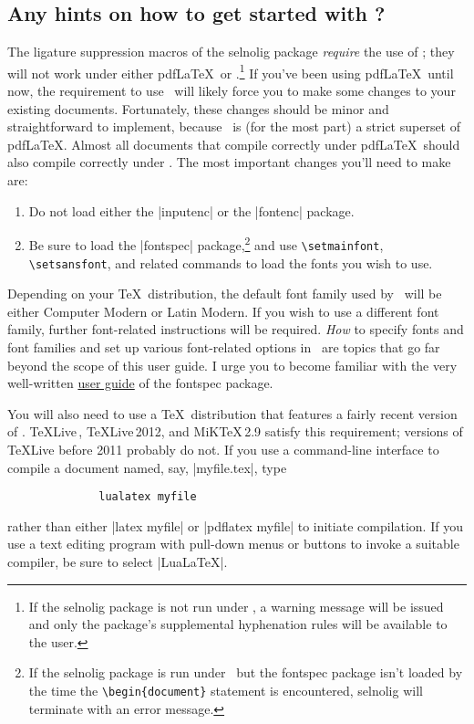 \documentclass[11pt]{article}
\newcommand{\pkg}[1]{\textsf{#1}}
\newcommand{\cmmd}[1]{\texttt{\textbackslash #1}}
\begin{document}
\subsection{Any hints on how to get started with \LuaLaTeX?}

\begingroup
\renewcommand\theenumi{(\roman{enumi})}
\renewcommand\labelenumi\theenumi

The ligature suppression macros of the \pkg{selnolig} package \emph{require} the use of \LuaLaTeX; they will not work under either pdf\LaTeX\ or \XeLaTeX.\footnote{If the \pkg{selnolig} package is not run under \LuaLaTeX, a warning message will be issued and only the package's supplemental hyphenation rules will be available to the user.}
If you've been using pdf\LaTeX\ until now, the requirement to use \LuaLaTeX\ will likely force you to make some changes to your existing documents. Fortunately, these changes should be minor and straightforward to implement, because \LuaLaTeX\ is (for the most part) a strict superset of pdf\LaTeX. Almost all documents that compile correctly under pdf\LaTeX\ should also compile correctly under \LuaLaTeX. The most important changes you'll need to make are: 
\begin{enumerate}
\item Do not load either the |inputenc| or the |fontenc| package. 
\item Be sure to load the |fontspec| package,\footnote{If the \pkg{selnolig} package is run under \LuaLaTeX\ but the \pkg{fontspec} package isn't loaded by the time the \Verb+\begin{document}+ statement is encountered, \pkg{selnolig} will terminate with an error message.} and use \cmmd{setmainfont}, \cmmd{setsansfont}, and related commands to load the fonts you wish to use.
\end{enumerate}
\endgroup


Depending on your \TeX\ distribution, the default font family used by \LuaLaTeX\ will be either Computer Modern or Latin Modern. If you wish to use a different font family, further font-related instructions will be required. \emph{How} to specify fonts and font families and set up various font-related options in \LuaLaTeX\ are topics that go far beyond the scope of this user guide. I urge you to become familiar with the very well-written
 \href{http://www.ctan.org/tex-archive/macros/latex/contrib/fontspec/fontspec.pdf}{user guide} of the \pkg{fontspec} package.

You will also need to use a \TeX\ distribution that features a fairly recent version of \LuaLaTeX. \TeX Live\,, \TeX Live\,2012, and MiK\TeX\,2.9 satisfy this requirement; versions of \TeX Live before 2011 probably do not. If you use a command-line interface to compile a document named, say, |myfile.tex|, type 
\begin{Verbatim}
              lualatex myfile
\end{Verbatim}
rather than either |latex myfile| or |pdflatex myfile| to initiate compilation. If you use a text editing program with pull-down menus or buttons to invoke a suitable compiler, be sure to select |LuaLaTeX|. 
\end{document}
